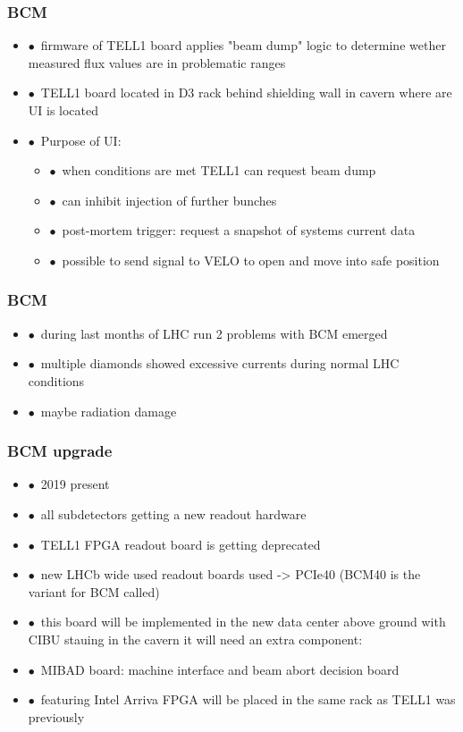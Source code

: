 \documentclass[aspectratio=1610, 12pt, xcolor=dvipsnames]{beamer}
\begin{document}
\begin{frame}\frametitle{BCM}
  \begin{itemize}
    \item $\bullet$\, firmware of TELL1 board applies "beam dump" logic to determine wether measured flux values are in problematic ranges
    \item $\bullet$\, TELL1 board located in D3 rack behind shielding wall in cavern where are UI is located
    \item $\bullet$\, Purpose of UI:
    \begin{itemize}
      \item $\bullet$\, when conditions are met TELL1 can request beam dump
      \item $\bullet$\, can inhibit injection of further bunches
      \item $\bullet$\, post-mortem trigger: request a snapshot of systems current data
      \item $\bullet$\, possible to send signal to VELO to open and move into safe position
    \end{itemize}
  \end{itemize}
\end{frame}

\begin{frame}\frametitle{BCM}
  \begin{itemize}
    \item $\bullet$\, during last months of LHC run 2 problems with BCM emerged
    \item $\bullet$\, multiple diamonds showed excessive currents during normal LHC conditions
    \item $\bullet$\, maybe radiation damage
  \end{itemize}
\end{frame}

\begin{frame}\frametitle{BCM upgrade}
  \begin{itemize}
    \item $\bullet$\, 2019 \to present
    \item $\bullet$\, all  subdetectors getting a new readout hardware
    \item $\bullet$\, TELL1 FPGA readout board is getting deprecated
    \item $\bullet$\, new LHCb wide used readout boards used -> PCIe40 (BCM40 is the variant for BCM called)
    \item $\bullet$\, this board will be implemented in the new data center above ground with CIBU stauing in the cavern it will need an extra component:
    \item $\bullet$\, MIBAD board: machine interface and beam abort decision board
    \item $\bullet$\, featuring Intel Arriva FPGA  will be placed in the same rack as TELL1 was previously
  \end{itemize}
\end{frame}
\end{document}
